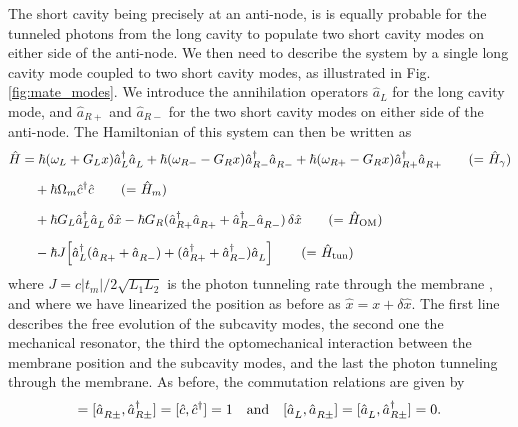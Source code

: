 The short cavity being precisely at an anti-node, is is equally probable for the tunneled photons from the long cavity to populate two short cavity modes on either side of the anti-node. 
We then need to describe the system by a single long cavity mode coupled to two short cavity modes, as illustrated in Fig. \ref{fig:mate_modes}. We introduce the annihilation operators \(\hat a_L\) for the long cavity mode, and \(\hat a_{R+}\) and \(\hat a_{R-}\) for the two short cavity modes on either side of the anti-node. The Hamiltonian of this system can then be written as
\begin{align}
\hat H
&= \hbar (\omega_L + G_L x ) \hat a_L^\dagger \hat a_L^{\vphantom{\dagger}}
 + \hbar (\omega_{R-} -  G_R x ) \hat a_{R-}^\dagger \hat a_{R-}^{\vphantom{\dagger}}
 + \hbar (\omega_{R+} -  G_R x ) \hat a_{R+}^\dagger \hat a_{R+}^{\vphantom{\dagger}}
\tag*{(= $\hat H_\gamma$)}
\\[2mm]
& \quad + \hbar \Omega_m \hat c^\dagger \hat c^{\vphantom{\dagger}}
\tag*{(= $\hat H_m$)}
\\[2mm]
&\quad + \hbar G_L \hat a_L^\dagger \hat a_L^{\vphantom{\dagger}} \, \delta \hat x
 - \hbar G_R (\hat a_{R+}^\dagger \hat a_{R+}^{\vphantom{\dagger}}
              +\hat a_{R-}^\dagger \hat a_{R-}^{\vphantom{\dagger}})\, \delta \hat x
\tag*{(= $\hat H_{\rm OM}$)}
\\[2mm]
&\quad - \hbar J \!\left[
    \hat a_L^\dagger(\hat a_{R+}^{\vphantom{\dagger}}+\hat a_{R-}^{\vphantom{\dagger}})
   +(\hat a_{R+}^\dagger+\hat a_{R-}^\dagger)\hat a_L^{\vphantom{\dagger}}
\right]
\tag*{(= $\hat H_{\rm tun}$)}
\end{align}
where \(J = c|t_m|/2\sqrt{L_1 L_2}\) is the photon tunneling rate through the membrane \cite{dumont_quantum_2022}, and where we have linearized the position as before as $\hat x = x + \delta \hat x$. The first line describes the free evolution of the subcavity modes, the second one the mechanical resonator, the third the optomechanical interaction between the membrane position and the subcavity modes, and the last the photon tunneling through the membrane. As before, the commutation relations are given by 
\begin{equation*}
  [\hat a_L^{\vphantom{\dagger}}, \hat a_L^\dagger] = [\hat a_{R \pm}^{\vphantom{\dagger}}  , \hat a_{R\pm}^\dagger] = [\hat c, \hat c^\dagger] = 1 \quad \text{and} \quad [\hat a_L^{\vphantom{\dagger}}, \hat a_{R\pm}^{\vphantom{\dagger}}] = [\hat a_L^{\vphantom{\dagger}},\hat a_{R\pm}^{\dagger}]  = 0.
\end{equation*}
